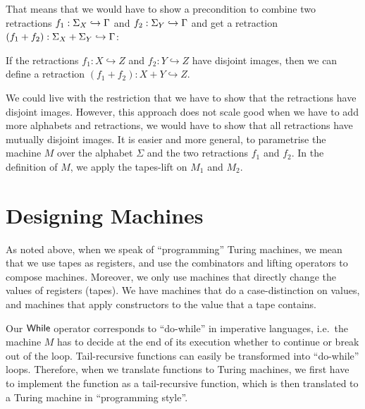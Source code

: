 That means that we would have to show a precondition to combine two retractions $f_1 : \Sigma_X \hookrightarrow \Gamma$ and
$f_2 : \Sigma_Y \hookrightarrow \Gamma$ and get a retraction $(f_1+f_2) : \Sigma_X + \Sigma_Y \hookrightarrow \Gamma$:
\begin{fact}
  If the retractions $f_1 : X \hookrightarrow Z$ and $f_2 : Y \hookrightarrow Z$ have disjoint images, then we can define a retraction
  $(f_1+f_2) : X+Y \hookrightarrow Z$.
\end{fact}

We could live with the restriction that we have to show that the retractions have disjoint images.  However, this approach does not scale good when we
have to add more alphabets and retractions, we would have to show that all retractions have mutually disjoint images.  It is easier and more general,
to parametrise the machine $M$ over the alphabet $\Sigma$ and the two retractions $f_1$ and $f_2$.  In the definition of $M$, we apply the tapes-lift
on $M_1$ and $M_2$.



\section{Designing Machines}
\label{sec:programming-design}
%

As noted above, when we speak of ``programming'' Turing machines, we mean that we use tapes as registers, and use the combinators and lifting
operators to compose machines.  Moreover, we only use machines that directly change the values of registers (tapes).  We have machines that do a
case-distinction on values, and machines that apply constructors to the value that a tape contains.

Our $\mathsf{While}$ operator corresponds to ``do-while'' in imperative languages, i.e.\ the machine $M$ has to decide at the end of its execution whether to
continue or break out of the loop.  Tail-recursive functions can easily be transformed into ``do-while'' loops.  Therefore, when we translate
functions to Turing machines, we first have to implement the function as a tail-recursive function, which is then translated to a Turing machine in
``programming style''.


